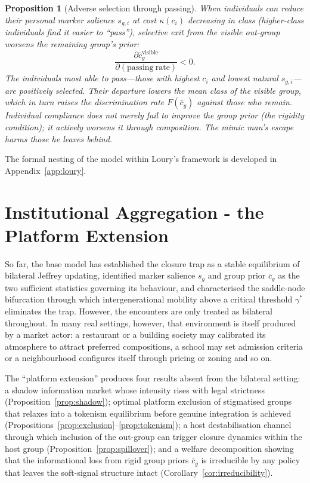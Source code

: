 \documentclass[12pt,a4paper]{article}
\newtheorem{proposition}{Proposition}
\theoremstyle{definition}
\numberwithin{proposition}{subsection}
\begin{document}
\begin{proposition}[Adverse selection through passing]
\label{prop:passing}
When individuals can reduce their personal marker salience $s_{g,i}$
at cost $\kappa(c_i)$ decreasing in class (higher-class individuals
find it easier to ``pass''), selective exit from the visible
out-group worsens the remaining group's prior:
\[
  \frac{\partial \bar{c}_g^{\mathrm{visible}}}
  {\partial (\mathrm{passing\ rate})} < 0.
\]
The individuals most able to pass---those with highest $c_i$ and
lowest natural $s_{g,i}$---are positively selected. Their departure
lowers the mean class of the visible group, which in turn raises
the discrimination rate $F(\bar{c}_g)$ against those who remain.
Individual compliance does not merely fail to improve the group
prior (the rigidity condition); it actively worsens it through
composition. The mimic man's escape harms those he leaves behind.
\end{proposition}

The formal nesting of the model within Loury's framework is developed
in Appendix~\ref{app:loury}.

\section{Institutional Aggregation - the Platform Extension}
\label{sec:platform}

So far, the base model has established the closure trap as a stable equilibrium
of bilateral Jeffrey updating, identified marker salience $s_g$ and
group prior $\bar{c}_g$ as the two sufficient statistics governing
its behaviour, and characterised the saddle-node bifurcation through
which intergenerational mobility above a critical threshold
$\gamma^*$ eliminates the trap. However, the encounters are only treated as bilateral
throughout. In many real settings, however, that environment is itself
produced by a market actor: a restaurant or a building society may calibrated its atmosphere
to attract preferred compositions, a school may set admission criteria or a neighbourhood configures itself through pricing or zoning and so on.

The ``platform extension'' produces four results absent from the bilateral setting: a
shadow information market whose intensity rises with legal strictness
(Proposition~\ref{prop:shadow}); optimal platform exclusion of
stigmatised groups that relaxes into a tokenism equilibrium before
genuine integration is achieved
(Propositions~\ref{prop:exclusion}--\ref{prop:tokenism}); a host
destabilisation channel through which inclusion of the out-group can
trigger closure dynamics within the host group
(Proposition~\ref{prop:spillover}); and a welfare decomposition
showing that the informational loss from rigid group priors
$\bar{c}_g$ is irreducible
by any policy that leaves the soft-signal structure intact
(Corollary~\ref{cor:irreducibility}).
\end{document}
